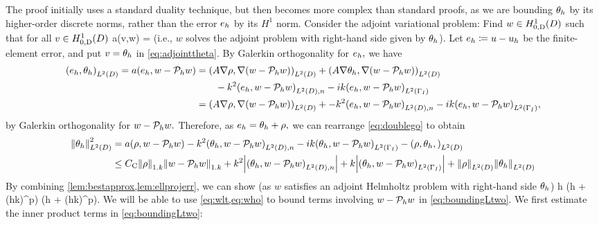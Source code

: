 The proof initially uses a standard duality technique, but then becomes more complex than standard proofs, as we are bounding $\theta_{h}$ by its higher-order discrete norms, rather than the error $e_{h}$ by its $H^1$ norm.
Consider the adjoint variational problem: Find $w \in \HozDD$ such that for all $v \in \HozDD$
\beq\label{eq:adjointtheta}
a(v,w) = 
\eeq
(i.e., $w$ solves the adjoint problem with right-hand side given by $\theta_{h}$). Let $e_{h} \coloneqq u -u_{h}$ be the finite-element error, and put $v = \theta_{h}$ in \cref{eq:adjointtheta}. By Galerkin orthogonality for $e_{h},$ we have
\begin{align}
\IPLtD{\eh}{\thetah} = a(\eh,w-\Ph w) &= \IPLtD{A \grad \rho}{\grad(w-\Ph w)} + \IPLtD{A \grad \thetah}{\grad(w-\Ph w)}\\
&\quad\quad -k^2 \IPLtDn{\eh}{w-\Ph w} -ik \IPLtGI{\eh}{w-\Ph w}\nonumber\\
&= \IPLtD{A \grad \rho}{\grad(w-\Ph w)} + -k^2 \IPLtDn{\eh}{w-\Ph w} -ik \IPLtGI{\eh}{w-\Ph w},\label{eq:doublego}
\end{align}
by Galerkin orthogonality for $w - \mathcal P_{h} w.$ Therefore, as $e_{h} = \theta_{h} + \rho,$ we can rearrange \cref{eq:doublego} to obtain
\begin{align}
\NLtD{\thetah}^2 &= a(\rho,w - \Ph w) -k^2 \IPLtDn{\thetah}{w-\Ph w} -ik \IPLtGI{\thetah}{w - \Ph w} - \IPLtD{\rho,\thetah}\nonumber\\
&\leq \Cc \NW{\rho} \NW{w- \Ph w} + k^2 \abs{\IPLtDn{\thetah}{w- \Ph w}} + k \abs{\IPLtGI{\thetah}{w-\Ph w}} + \NLtD{\rho}\NLtD{\thetah}\label{eq:boundingLtwo}
\end{align}
By combining \cref{lem:bestapprox,lem:ellprojerr}, we can show (as $w$ satisfies an adjoint Helmholtz problem with right-hand side $\theta_{h}$)
\beq\label{eq:wlt}
 \leq {} h \mleft(\CFEMotilde h + \CFEMttilde \CAnk (hk)^p\mright)\NLtD{\thetah} \tand
\eeq
\beq\label{eq:who}
 \leq {} \mleft(\CFEMotilde h + \CFEMttilde \CAnk (hk)^p\mright)\NLtD{\thetah}.
\eeq
We will be able to use \cref{eq:wlt,eq:who} to bound terms involving $w - \mathcal P_{h} w$ in \cref{eq:boundingLtwo}. We first estimate the inner product terms in \cref{eq:boundingLtwo}:
